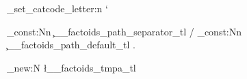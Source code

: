 %
\usepackage{expl3}
\usepackage{xparse}

\usepackage[warnunknown, fasterrors, mathletters]{ucs}
\usepackage[utf8x]{inputenc}
\usepackage[cm]{fullpage}
\usepackage[english]{babel}
\everymath{\displaystyle}

\usepackage{amsfonts, amsthm, amsmath, amssymb}
\usepackage{mathtools}  %
\usepackage[fontsize=14pt]{scrextend}

\usepackage{cancel, textcomp}
\usepackage[mathscr]{euscript}
\usepackage[nointegrals]{wasysym}

\usepackage{physics}  %
\usepackage{tikz-cd}  %
\usetikzlibrary{angles}
\usepackage{color}  %
\usepackage{microtype}  %
\usepackage{mathrsfs}  %
\usepackage{polynom}

\def\mbb#1{\mathbb{#1}}
\def\mfk#1{\mathfrak{#1}}

\def\N{\mbb{N}}
\def\C{\mbb{C}}
\def\R{\mbb{R}}
\def\pr{\mbb{P}}
\def\Q{\mbb{Q}}
\def\Z{\mbb{Z}}

\def\la{\leftarrow}
\def\La{\Leftarrow}
\def\ra{\rightarrow}
\def\Ra{\Rightarrow}
\def\lp{\left(}
\def\rp{\right)}
\def\lk{\left[}
\def\rk{\right]}
\def\lb{\left\{}
\def\rb{\right\}}

\def\del{\nabla}
\def\eps{\varepsilon}
\def\inv{{-1}}
\def\pa{\partial}
\def\vp{\varphi}
\def\y{\infty}
\def\th{\theta}

\newcommand{\func}[3]{#1\colon#2\to#3}
\newcommand{\vfunc}[5]{\func{#1}{#2}{#3},\quad#4\longmapsto#5}
\newcommand{\floor}[1]{\left\lfloor#1\right\rfloor}
\newcommand{\ceil}[1]{\left\lceil#1\right\rceil}
\newcommand{\pdif}[3]{\frac{\partial^{#3}#1}{\partial#2^{#3}}}

\ExplSyntaxOn
\char_set_catcode_letter:n { `\@ }


\tl_const:Nn \c__factoids_path_separator_tl { / }
\tl_const:Nn \c__factoids_path_default_tl   { . }

\tl_new:N \l__factoids_tmpa_tl

